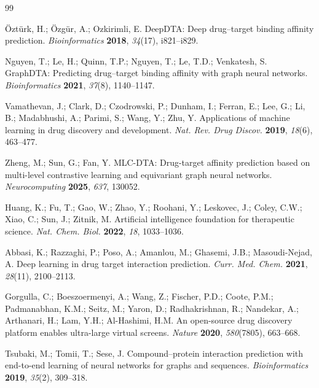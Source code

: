 \documentclass[10pt,a4paper,twocolumn]{article}
\begin{document}
\clearpage
\begin{thebibliography}{99}

Öztürk, H.; Özgür, A.; Ozkirimli, E. DeepDTA: Deep drug--target binding affinity prediction. \textit{Bioinformatics} \textbf{2018}, \textit{34}(17), i821--i829.


Nguyen, T.; Le, H.; Quinn, T.P.; Nguyen, T.; Le, T.D.; Venkatesh, S. GraphDTA: Predicting drug--target binding affinity with graph neural networks. \textit{Bioinformatics} \textbf{2021}, \textit{37}(8), 1140--1147.


Vamathevan, J.; Clark, D.; Czodrowski, P.; Dunham, I.; Ferran, E.; Lee, G.; Li, B.; Madabhushi, A.; Parimi, S.; Wang, Y.; Zhu, Y. Applications of machine learning in drug discovery and development. \textit{Nat. Rev. Drug Discov.} \textbf{2019}, \textit{18}(6), 463--477.


Zheng, M.; Sun, G.; Fan, Y. MLC-DTA: Drug-target affinity prediction based on multi-level contrastive learning and equivariant graph neural networks. \textit{Neurocomputing} \textbf{2025}, \textit{637}, 130052.


Huang, K.; Fu, T.; Gao, W.; Zhao, Y.; Roohani, Y.; Leskovec, J.; Coley, C.W.; Xiao, C.; Sun, J.; Zitnik, M. Artificial intelligence foundation for therapeutic science. \textit{Nat. Chem. Biol.} \textbf{2022}, \textit{18}, 1033--1036.



Abbasi, K.; Razzaghi, P.; Poso, A.; Amanlou, M.; Ghasemi, J.B.; Masoudi-Nejad, A. Deep learning in drug target interaction prediction. \textit{Curr. Med. Chem.} \textbf{2021}, \textit{28}(11), 2100--2113.


Gorgulla, C.; Boeszoermenyi, A.; Wang, Z.; Fischer, P.D.; Coote, P.M.; Padmanabhan, K.M.; Seitz, M.; Yaron, D.; Radhakrishnan, R.; Nandekar, A.; Arthanari, H.; Lam, Y.H.; Al-Hashimi, H.M. An open-source drug discovery platform enables ultra-large virtual screens. \textit{Nature} \textbf{2020}, \textit{580}(7805), 663--668.


Tsubaki, M.; Tomii, T.; Sese, J. Compound--protein interaction prediction with end-to-end learning of neural networks for graphs and sequences. \textit{Bioinformatics} \textbf{2019}, \textit{35}(2), 309--318.



\end{thebibliography}
\end{document}
